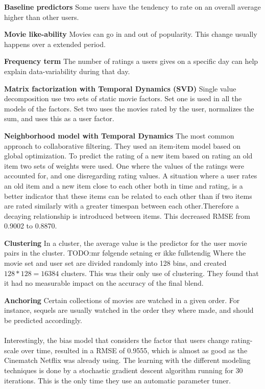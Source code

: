 \textbf{Baseline predictors}  Some users have the tendency to rate on an overall average higher than other users.

\textbf{Movie like-ability}  Movies can go in and out of popularity. This change usually happens over a extended period.

\textbf{Frequency term}  The number of ratings a users gives on a specific day can help explain data-variability during that day.

\textbf{Matrix factorization with Temporal Dynamics (SVD)}  Single value decomposition use two sets of static movie factors. Set one is used in all the models of the factors. Set two uses the movies rated by the user, normalizes the sum, and uses this as a user factor.

\textbf{Neighborhood model with Temporal Dynamics}  The most common approach to collaborative filtering. They used an item-item model based on global optimization. To predict the rating of a new item based on rating an old item two sets of weights were used. One where the values of the ratings were accounted for, and one disregarding rating values.
A situation where a user rates an old item and a new item close to each other both in time and rating, is a better indicator that these items can be related to each other than if two items are rated similarly with a greater timespan between each other.Therefore a decaying relationship is introduced between items. This decreased RMSE from 0.9002 to 0.8870.\cite{BellKor-CF-TD}

\textbf{Clustering}  In a cluster, the average value is the predictor for the user movie pairs in the cluster.
TODO:mr følgende setning er ikke fullstendig
Where the movie set and user set are divided randomly into 128 bins, and created $128*128=16384$ clusters. This was their only use of clustering.
They found that it had no measurable impact on the accuracy of the final blend\cite{pragmatictheory-sol}.

\textbf{Anchoring}  Certain collections of movies are watched in a given order. For instance, sequels are usually watched in the order they where made, and should be predicted accordingly. \\\\


Interestingly, the bias model that considers the factor that users change rating-scale over time, resulted in a RMSE of 0.9555, which is almost as good as the Cinematch Netflix was already using. The learning with the different modeling techniques is done by a stochastic gradient descent algorithm running for 30 iterations. This is the only time they use an automatic parameter tuner. \cite{BellKor-2008-sol}

